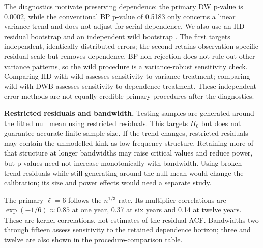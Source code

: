 \documentclass[11pt,a4paper]{article}
\begin{document}
The diagnostics motivate preserving dependence: the primary DW p-value is 0.0002, while the conventional BP p-value of 0.5183 only concerns a linear variance trend and does not adjust for serial dependence. We also use an IID residual bootstrap and an independent wild bootstrap \cite{wu,liu}. The first targets independent, identically distributed errors; the second retains observation-specific residual scale but removes dependence. BP non-rejection does not rule out other variance patterns, so the wild procedure is a variance-robust sensitivity check. Comparing IID with wild assesses sensitivity to variance treatment; comparing wild with DWB assesses sensitivity to dependence treatment. These independent-error methods are not equally credible primary procedures after the diagnostics.

\textbf{Restricted residuals and bandwidth.} Testing samples are generated around the fitted null mean using restricted residuals. This targets $H_0$ but does not guarantee accurate finite-sample size. If the trend changes, restricted residuals may contain the unmodelled kink as low-frequency structure. Retaining more of that structure at longer bandwidths may raise critical values and reduce power, but p-values need not increase monotonically with bandwidth. Using broken-trend residuals while still generating around the null mean would change the calibration; its size and power effects would need a separate study.

The primary $\ell=6$ follows the $n^{1/3}$ rate. Its multiplier correlations are $\exp(-1/6)\approx0.85$ at one year, 0.37 at six years and 0.14 at twelve years. These are kernel correlations, not estimates of the residual ACF. Bandwidths two through fifteen assess sensitivity to the retained dependence horizon; three and twelve are also shown in the procedure-comparison table.
\end{document}
